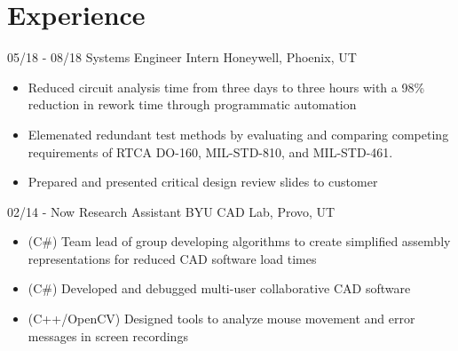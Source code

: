 \documentclass[]{friggeri-cv}
\begin{document}
\section{Experience}
\vspace{-3mm}
\begin{entrylist}
  \entry
    {05/18 - 08/18}
    {Systems Engineer Intern}
    {Honeywell, Phoenix, UT}
    {\vspace{-4mm}
    \begin{itemize}
        \item Reduced circuit analysis time from three days to three hours with a 98\% reduction in rework time through programmatic automation
        \item Elemenated redundant test methods by evaluating and comparing competing requirements of RTCA DO-160, MIL-STD-810, and MIL-STD-461.
        \item Prepared and presented critical design review slides to customer
    \end{itemize}\vspace{1mm}}
  \entry
    {02/14 - Now}
    {Research Assistant}
    {BYU CAD Lab, Provo, UT}
    {\vspace{-4mm}
    \begin{itemize}
        \item (C\#) Team lead of group developing algorithms to create simplified assembly representations for reduced CAD software load times
        \item (C\#) Developed and debugged multi-user collaborative CAD software
        \item (C++/OpenCV) Designed tools to analyze mouse movement and error messages in screen recordings
    \end{itemize}\vspace{1mm}}

\end{entrylist}
\end{document}
